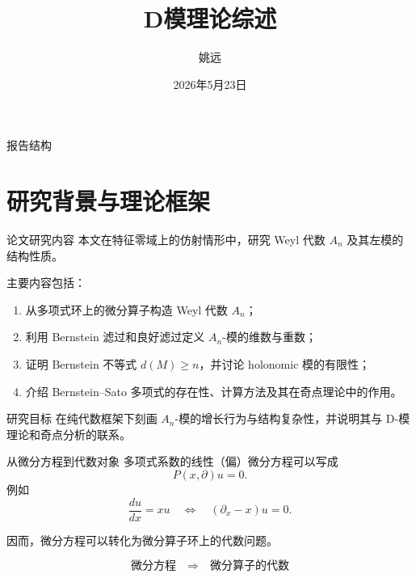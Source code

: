 \documentclass[aspectratio=169,11pt]{ctexbeamer}
\title{D模理论综述}
\author{姚远}
\institute[海南大学数学与统计学院]{海南大学数学与统计学院\\[0.6em]指导老师：陈颖}
\date{2026年5月23日}
\begin{document}
\begin{frame}
    \titlepage
\end{frame}

\begin{frame}{报告结构}
    \tableofcontents
\end{frame}

\section{研究背景与理论框架}

\begin{frame}{论文研究内容}
    本文在特征零域上的仿射情形中，研究 Weyl 代数 $A_n$ 及其左模的结构性质。

    \vspace{0.6em}
    主要内容包括：

    \begin{enumerate}
        \item 从多项式环上的微分算子构造 Weyl 代数 $A_n$；
        \item 利用 Bernstein 滤过和良好滤过定义 $A_n$-模的维数与重数；
        \item 证明 Bernstein 不等式 $d(M)\ge n$，并讨论 holonomic 模的有限性；
        \item 介绍 Bernstein--Sato 多项式的存在性、计算方法及其在奇点理论中的作用。
    \end{enumerate}
    \pause
    \begin{block}{研究目标}
        在纯代数框架下刻画 $A_n$-模的增长行为与结构复杂性，并说明其与 D-模理论和奇点分析的联系。
    \end{block}

\end{frame}

\begin{frame}{从微分方程到代数对象}
    多项式系数的线性（偏）微分方程可以写成
    \[
        P(x,\partial)u=0.
    \]
    \pause
    例如
    \[
        \frac{du}{dx}=xu
        \quad\Longleftrightarrow\quad
        (\partial_x-x)u=0.
    \]

    \vspace{0.6em}
    \pause
    因而，微分方程可以转化为微分算子环上的代数问题。

    \[
        \text{微分方程}
        \quad\Longrightarrow\quad
        \text{微分算子的代数}
    \]

\end{frame}
\end{document}
